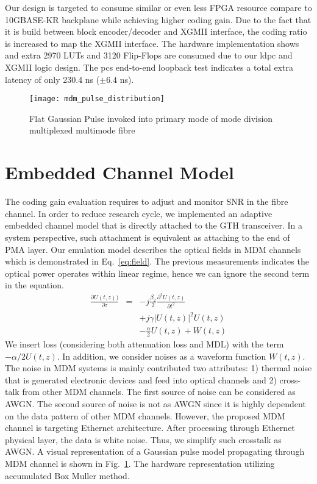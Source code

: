 Our design is targeted to consume similar or even less FPGA resource compare to 10GBASE-KR backplane while achieving higher coding gain. Due to the fact that it is build between block encoder/decoder and XGMII interface, the coding ratio is increased to map the XGMII interface. The hardware implementation shows and extra 2970 LUTs and 3120 Flip-Flops are consumed due to our \ac{ldpc} and XGMII logic design. The \ac{pcs} end-to-end loopback test indicates a total extra latency of only 230.4 ns ($\pm 6.4$ ns). 

\begin{figure}[h]
  \centering
  \texttt{[image: mdm\_pulse\_distribution]}
  \caption{Flat Gaussian Pulse invoked into primary mode of mode division multiplexed multimode fibre}
  \label{fig:mdm_pulse}
\end{figure}


\section{Embedded Channel Model}
The coding gain evaluation requires to adjust and monitor SNR in the fibre channel. In order to reduce research cycle, we implemented an adaptive embedded channel model that is directly attached to the GTH transceiver. In a system perspective, such attachment is equivalent as attaching to the end of PMA layer. Our emulation model describes the optical fields in MDM channels which is demonstrated in Eq.~\ref{eq:field}. The previous measurements indicates the optical power operates within linear regime, hence we can ignore the second term in the equation.
\begin{eqnarray}
\frac{\partial U(t,z))}{\partial z} &{}={}& - j\frac{\beta_2}{2} \frac{\partial^2U(t,z)}{\partial t^2} \nonumber\\
                                    && + j\gamma |U(t,z)|^2 U(t,z) \nonumber \\
                                    && -\frac{\alpha}{2} U (t,z) + W(t,z)
\label{eq:field}
\end{eqnarray}
We insert loss (considering both attenuation loss and MDL) with the term $-\alpha/2 U (t,z)$. In addition, we consider noises as a waveform function $W(t,z)$. The noise in MDM systems is mainly contributed two attributes: 1) thermal noise that is generated electronic devices and feed into optical channels and 2) cross-talk from other MDM channels. The first source of noise can be considered as AWGN. The second source of noise is not as AWGN since it is highly dependent on the data pattern of other MDM channels. However, the proposed MDM channel is targeting Ethernet architecture. After processing through Ethernet physical layer, the data is white noise\cite{audzevich2013low}. Thus, we simplify such crosstalk as AWGN. A visual representation of a Gaussian pulse model propagating through MDM channel is shown in Fig.~\ref{fig:mdm_pulse}. The hardware representation utilizing accumulated Box Muller method\cite{911557}.

